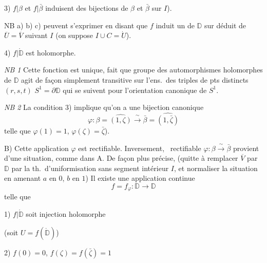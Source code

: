 \documentclass[11pt,a4paper]{article}
\begin{document}
3) $f|\beta$ et $f|\bar\beta$ induisent des bijections de $\beta$ et
$\bar\beta$ sur $I$).

NB a) b) c) peuvent s'exprimer en disant que $f$ induit un \struck{\ill{}}
\ill{} de $\mathbb{D}$ sur \ill{} déduit de $\overline{U} = \overline{V}$
suivant $I$ (on suppose $I \cup C = \dot U$).

4) $f|\mathring{\mathbb{D}}$ est holomorphe.


\emph{NB 1} Cette fonction est unique,  fait que
 groupe des automorphismes  holomorphes de
$\mathbb{D}$ agit de façon simplement transitive sur l'ens.\ des triples
\ill{} de pts distincts $(r, s, t)$  $S^1 = \partial\mathbb{D}$ qui
se suivent pour l'orientation canonique de \struck{\ill{}} $S^1$.
\struck{\ill{}}

\emph{NB 2} La condition 3) implique qu'on a une \struck{\ill{}} bijection
canonique
\[
  \varphi : \beta = \widehat{(1,\zeta)} \xrightarrow{\ \sim\ }
  \bar\beta = \widehat{(1,\bar\zeta)}
\]
telle que $\varphi(1) = 1$, $\varphi(\zeta) = \bar\zeta$).

B) Cette application $\varphi$ est rectifiable. Inversement,
  \ rectifiable
$\varphi : \beta \xrightarrow{\ \sim\ } \bar\beta$ provient d'une situation,
comme dans A. De façon plus précise,  (quitte à
remplacer $\overline{V}$ par $\mathbb{D}$ par la th.\ d'uniformisation
 sans segment intérieur $I$, et normaliser la
situation en \struck{\ill{}} amenant $a$ en $0$, $b$ en $1$)
 Il existe une application continue
\[
  f = f_{\varphi} : \mathbb{D} \longrightarrow \mathbb{D}
\]
telle que

1) $f|\mathring{\mathbb{D}}$ soit  injection holomorphe



(soit $U = f(\mathring{\mathbb{D}})$)

2) $f(0) = 0$, $f(\zeta) = f(\bar\zeta) = 1$
\end{document}
